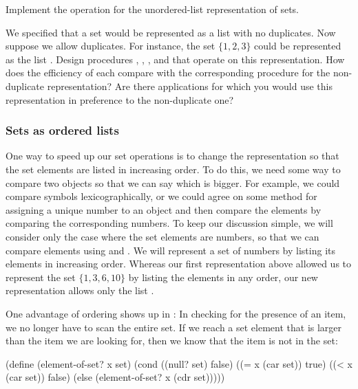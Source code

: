 \begin{exerciseGroup}
\label{Exercise 2.59}
 Implement the 
operation for the unordered-list representation of sets.

\label{Exercise 2.60}
 We specified that a set would be
represented as a list with no duplicates.  Now suppose we allow duplicates.
For instance, the set \( \{1, 2, 3\} \) could be represented as the list .  Design procedures , ,
, and  that operate on this
representation.  How does the efficiency of each compare with the corresponding
procedure for the non-duplicate representation?  Are there applications for
which you would use this representation in preference to the non-duplicate one?
\end{exerciseGroup}

\subsubsection*{Sets as ordered lists}

One way to speed up our set operations is to change the representation so that
the set elements are listed in increasing order.  To do this, we need some way
to compare two objects so that we can say which is bigger.  For example, we
could compare symbols lexicographically, or we could agree on some method for
assigning a unique number to an object and then compare the elements by
comparing the corresponding numbers.  To keep our discussion simple, we will
consider only the case where the set elements are numbers, so that we can
compare elements using \code{>} and \code{<}.  We will represent a set of
numbers by listing its elements in increasing order.  Whereas our first
representation above allowed us to represent the set \( \{1, 3, 6, 10\} \) by listing
the elements in any order, our new representation allows only the list .

One advantage of ordering shows up in : In checking for
the presence of an item, we no longer have to scan the entire set.  If we reach
a set element that is larger than the item we are looking for, then we know
that the item is not in the set:

\begin{codeBlock}
(define (element-of-set? x set)
  (cond ((null? set) false)
        ((= x (car set)) true)
        ((< x (car set)) false)
        (else (element-of-set? x (cdr set)))))
\end{codeBlock}

